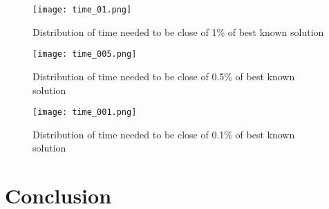 \documentclass[a4paper,10pt]{article}
\begin{document}
	\begin{figure}[H]
		\centering
		\caption{Distribution of time needed to be close of 1\% of best known solution}
		\texttt{[image: time\_01.png]}
	\end{figure}

	\begin{figure}[H]
		\centering
		\caption{Distribution of time needed to be close of 0.5\% of best known solution}
		\texttt{[image: time\_005.png]}
	\end{figure}

	\begin{figure}[H]
		\centering
		\caption{Distribution of time needed to be close of 0.1\% of best known solution}
		\texttt{[image: time\_001.png]}
	\end{figure}


\section{Conclusion}




\end{document}
